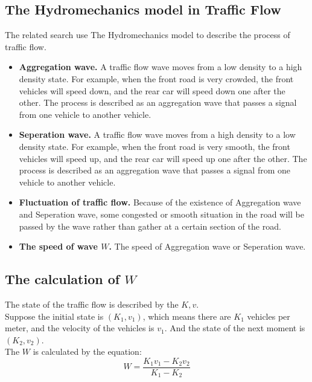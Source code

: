 \documentclass{mcmthesis}
\begin{document}
\subsection{The Hydromechanics model in Traffic Flow}
The related search use The Hydromechanics model to describe the process of traffic flow.
\begin{itemize}
\item{\textbf{Aggregation wave.} A traffic flow wave moves from a low density to a high density state. For example, when the front road is very crowded, the front vehicles will speed down, and the rear car will speed down one after the other. The process is described as an aggregation wave that passes a signal from one vehicle to another vehicle.}
\end{itemize}
\begin{itemize}
\item{\textbf{Seperation wave.} A traffic flow wave moves from a high density to a low density state. For example, when the front road is very smooth, the front vehicles will speed up, and the rear car will speed up one after the other. The process is described as an aggregation wave that passes a signal from one vehicle to another vehicle.}
\end{itemize}
\begin{itemize}
\item{\textbf{Fluctuation of traffic flow.} Because of the existence of Aggregation wave and Seperation wave, some congested or smooth situation in the road will be passed by the wave rather than gather at a certain section of the road.}
\end{itemize}
\begin{itemize}
\item{\textbf{The speed of wave $W$.} The speed of Aggregation wave or Seperation wave.}
\end{itemize}
\subsection{The calculation of $W$}
\indent The state of the traffic flow is described by the $K,v$.\\
\indent Suppose the initial state is $(K_{1}, v_{1})$, which means there are $K_{1}$ vehicles per meter, and the velocity of the vehicles is $v_{1}$. And the state of the next moment is $(K_{2}, v_{2})$. \\
\indent The $W$ is calculated by the equation:
\begin{equation}
	W=\frac{K_{1}v_{1}-K_{2}v_{2}}{K_{1}-K_{2}}
\end{equation}
\end{document}
